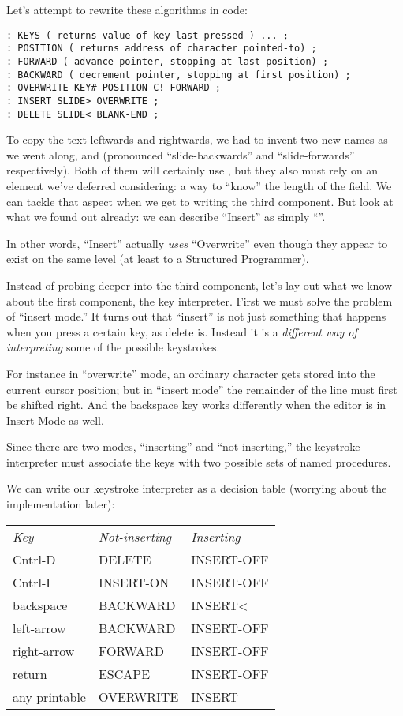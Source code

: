 Let's attempt to rewrite these algorithms in code:

\begin{verbatim}
: KEYS ( returns value of key last pressed ) ... ;
: POSITION ( returns address of character pointed-to) ;
: FORWARD ( advance pointer, stopping at last position) ;
: BACKWARD ( decrement pointer, stopping at first position) ;
: OVERWRITE KEY# POSITION C! FORWARD ;
: INSERT SLIDE> OVERWRITE ;
: DELETE SLIDE< BLANK-END ;
\end{verbatim}

To copy the text leftwards and rightwards, we had to invent two new
names as we went along,  and  (pronounced
``slide-backwards'' and ``slide-forwards'' respectively). Both of them
will certainly use , but they also must rely on an element
we've deferred considering: a way to ``know'' the length of the
field. We can tackle that aspect when we get to writing the third
component.  But look at what we found out already: we can describe
``Insert'' as simply ``''.

In other words, ``Insert'' actually \emph{uses} ``Overwrite'' even though
they appear to exist on the same level (at least to a Structured
Programmer).

Instead of probing deeper into the third component, let's lay out
what we know about the first component, the key interpreter. First we
must solve the problem of ``insert mode.'' It turns out that ``insert'' is
not just something that happens when you press a certain key, as
delete is. Instead it is a \emph{different way of interpreting}
some of the possible keystrokes.

For instance in ``overwrite'' mode, an ordinary character gets stored
into the current cursor position; but in ``insert mode'' the remainder
of the line must first be shifted right. And the backspace key works
differently when the editor is in Insert Mode as well.

Since there are two modes, ``inserting'' and ``not-inserting,'' the
keystroke interpreter must associate the keys with two possible sets of
named procedures.

We can write our keystroke interpreter as a decision table (worrying
about the implementation later):

\begin{tabular}{>{\ttfamily}l>{\ttfamily}l>{\ttfamily}l}
\emph{\textrm{Key}} &\emph{\textrm{Not-inserting}}& \emph{\textrm{Inserting}}\\
Cntrl-D        & DELETE              & INSERT-OFF\\
Cntrl-I        & INSERT-ON           & INSERT-OFF\\
backspace      & BACKWARD            & INSERT<	 \\
left-arrow     & BACKWARD            & INSERT-OFF\\
right-arrow    & FORWARD             & INSERT-OFF\\
return         & ESCAPE              & INSERT-OFF\\
any printable  & OVERWRITE           & INSERT    \\
\end{tabular}


